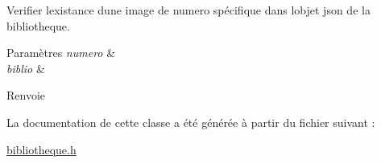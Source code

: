 Verifier l\textquotesingle{}existance d\textquotesingle{}une image de numero spécifique dans l\textquotesingle{}objet json de la bibliotheque. 


\begin{DoxyParams}{Paramètres}
{\em numero} & \\
\hline
{\em biblio} & \\
\hline
\end{DoxyParams}
\begin{DoxyReturn}{Renvoie}

\end{DoxyReturn}


La documentation de cette classe a été générée à partir du fichier suivant \+:\begin{DoxyCompactItemize}
\item 
\hyperlink{bibliotheque_8h}{bibliotheque.\+h}\end{DoxyCompactItemize}
